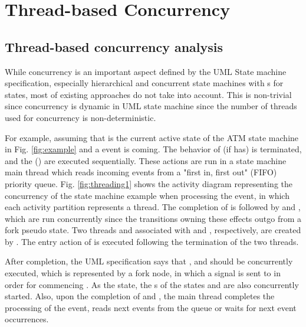 \section{Thread-based Concurrency}
\label{sec:thread}
\subsection{Thread-based concurrency analysis} 

While concurrency is an important aspect defined by the UML State machine specification, especially hierarchical and concurrent state machines with s for states, most of existing approaches do not take into account. This is non-trivial since concurrency is dynamic in UML state machine since the number of threads used for concurrency is non-deterministic.

For example, assuming that  is the current active state of the ATM state machine in Fig. 
\ref{fig:example} and a  event is coming. 
The  behavior of   (if has) is terminated,  and the  () are executed sequentially. 
These actions are run in a state machine main thread which reads incoming events from a "first in, first out" (FIFO) priority queue. 
Fig. \ref{fig:threading1} shows the activity diagram representing the concurrency of the state machine example when processing the  event, in which each activity partition represents a thread. 
The completion of  is followed by  and , which are run concurrently since the transitions owning these effects outgo from a fork pseudo state. 
Two threads  and  associated with  and , respectively, are created by .
The entry action  of  is executed following the termination of the two threads. 

After  completion, the UML specification says that ,  and  should be concurrently executed, which is represented by a fork node, in which a  signal is sent to  in order for commencing . 
As the  state, the s of the states  and  are also concurrently started. 
Also, upon the completion of  and , the main thread completes the processing of the  event, reads next events from the queue or waits for next event occurrences.

